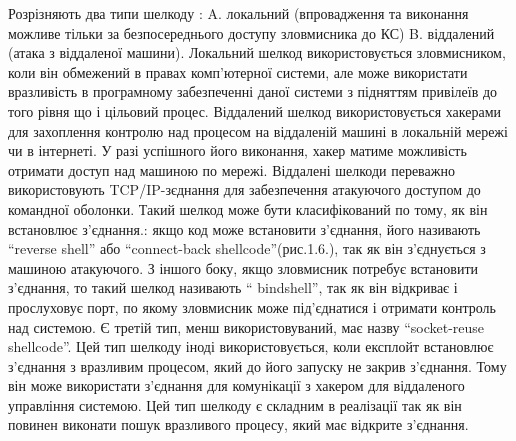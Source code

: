 \documentclass[oneside,final,14pt]{extreport}
\begin{document}
Розрізняють два типи шелкоду :
A.  локальний (впровадження та виконання можливе тільки за безпосереднього доступу зловмисника до КС)
B.  віддалений (атака з віддаленої машини).
Локальний шелкод використовується зловмисником, коли він обмежений в правах комп’ютерної системи, але може використати вразливість в програмному забезпеченні даної системи з підняттям привілеїв до того рівня що і цільовий процес.
Віддалений шелкод використовується хакерами для захоплення контролю над процесом на віддаленій машині в локальній мережі чи в інтернеті. У разі успішного його виконання, хакер матиме можливість отримати доступ над машиною по мережі. Віддалені шелкоди переважно використовують  TCP/IP-зєднання для забезпечення атакуючого доступом до командної оболонки. Такий шелкод може бути класифікований по тому, як він встановлює з’єднання.: якщо код може встановити з’єднання, його називають ``reverse shell'' або “connect-back shellcode”(рис.1.6.), так як він з’єднується з машиною атакуючого. З іншого боку, якщо зловмисник потребує встановити з’єднання, то такий шелкод називають “ bindshell”, так як він відкриває і прослуховує порт, по якому зловмисник може під’єднатися і отримати контроль над системою. Є третій тип, менш використовуваний, має назву “socket-reuse shellcode”. Цей тип шелкоду іноді використовується, коли експлойт встановлює з’єднання з вразливим процесом, який до його запуску не закрив з’єднання. Тому він може використати з’єднання для комунікації з хакером для віддаленого управління системою. Цей тип шелкоду є складним в реалізації так як він повинен виконати пошук вразливого процесу, який має відкрите з’єднання.
\end{document}
